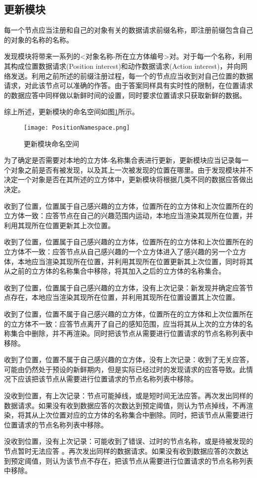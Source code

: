 \subsection{更新模块}
\par
每一个节点应当注册和自己的对象有关的数据请求前缀名称，即注册前缀包含自己的对象的名称的名称。
\par
发现模块将带来一系列的<对象名称-所在立方体编号>对。对于每一个名称，利用其构成位置数据请求(Position interest)和动作数据请求(Action interest)，并向网络发送。利用之前所述的前缀注册过程，每一个的节点应当收到对自己位置的数据请求，对此该节点可以准确的作答。由于答案同样具有实时性的限制，在位置请求的数据应答中同样做以新鲜时间的设置，同时要求位置请求只获取新鲜的数据。
\par
综上所述，更新模块的命名空间如图\ref{fig:PositionUpdateNamespace}所示。
\begin{figure}[h!]
	\centering
	\texttt{[image: PositionNamespace.png]}
	\caption{更新模块命名空间}
	\label{fig:PositionUpdateNamespace}
\end{figure}
\par
为了确定是否需要对本地的立方体-名称集合表进行更新，更新模块应当记录每一个对象之前是否有被发现，以及其上一次被发现的位置在哪里。由于发现模块并不决定一个对象是否在其所述的立方体中，更新模块将根据几类不同的数据应答做出决定。
\par
收到了位置，位置属于自己感兴趣的立方体，位置所在的立方体和上次位置所在的立方体一致：应答节点在自己的兴趣范围内运动，本地应当渲染其现所在位置，并利用其现所在位置更新其上次位置。
\par
收到了位置，位置属于自己感兴趣的立方体，位置所在的立方体和上次位置所在的立方体不一致：应答节点从自己感兴趣的一个立方体进入了感兴趣的另一个立方体，本地应当渲染其现所在位置，并利用其现所在位置更新其上次位置，同时将其从之前的立方体的名称集合中移除，将其加入之后的立方体的名称集合。
\par
收到了位置，位置属于自己感兴趣的立方体，没有上次记录：新发现并确定应答节点存在，本地应当渲染其现所在位置，并利用其现所在位置设置其上次位置。
\par
收到了位置，位置不属于自己感兴趣的立方体，位置所在的立方体和上次位置所在的立方体不一致：应答节点离开了自己的感知范围，应当将其从上次的立方体的名称集合中删除，并不再渲染。同时把该节点从需要进行位置请求的节点名称列表中移除。
\par
收到了位置，位置不属于自己感兴趣的立方体，没有上次记录：收到了无关应答，可能由仍然处于预设的新鲜期内，但是实际已经过时的发现请求的应答导致。此情况下应该把该节点从需要进行位置请求的节点名称列表中移除。
\par
没收到位置，有上次记录：节点可能掉线，或是短时间无法应答。再次发出同样的数据请求。如果没有收到数据应答的次数达到预定阈值，则认为节点掉线，不再渲染，将其从上次位置对应的立方体的名称集合中删除。同时，把该节点从需要进行位置请求的节点名称列表中移除。
\par
没收到位置，没有上次记录：可能收到了错误、过时的节点名称，或是待被发现的节点暂时无法应答 。再次发出同样的数据请求。如果没有收到数据应答的次数达到预定阈值，则认为该节点不存在，把该节点从需要进行位置请求的节点名称列表中移除。
